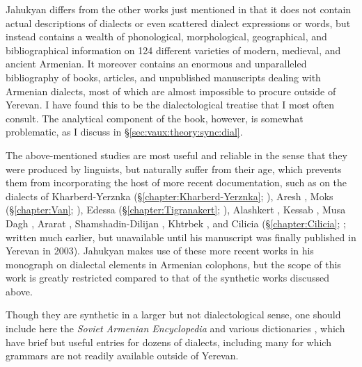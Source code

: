 \documentclass[output=paper]{langscibook}
\begin{document}
Jahukyan \citep{Jahukyan-1972-ArmenianDiaolectology} differs from the other works just mentioned in that it does not contain actual descriptions of dialects or even scattered dialect expressions or words, but instead contains a wealth of phonological, morphological, geographical, and bibliographical information on 124 different varieties of modern, medieval, and ancient Armenian. It moreover contains an enormous and unparalleled bibliography of books, articles, and unpublished manuscripts dealing with Armenian dialects, most of which are almost impossible to procure outside of Yerevan.  I have found this to be the dialectological treatise that I most often consult. The analytical component of the book, however, is somewhat problematic, as I discuss in \S\ref{sec:vaux:theory:sync:dial}.


The above-mentioned studies are most useful and reliable in the sense that they were produced by linguists, but naturally suffer from their age, which prevents them from incorporating the host of more recent documentation, such as on the dialects of Kharberd-Yerznka  (\S\ref{chapter:Kharberd-Yerznka}; \citealt{Kostandyan-1979-YerznkaDialect}),
Aresh \citep{Lusents-1982-AreshDialect},
Moks (\S\ref{chapter:Van}; \citealt{Muradyan-1982-MoksDialect}),
Edessa (\S\ref{chapter:Tigranakert}; \citealt{Haneyan-1982-EdessaDialect}),
Alashkert \citep{Madatyan-1985-Alashkertspeech},
Kessab \citep{Cholakian-2009-KesabDialect},
Musa Dagh  \citep{Habeshian-1986-MusaDagh},
Ararat \citep{Markosyan-1989-AraratDialect},
Shamshadin-Dilijan    \citep{Mejunts-1989-ShamshadinDilijan},
Khtrbek \citep{Hanayan-1995-SvediaDialectKhtrbek}, and  Cilicia (\S\ref{chapter:Cilicia}; \citealt{Adjarian-2003-CiliciaDialect};   written much earlier, but unavailable until his manuscript was finally published in Yerevan in 2003).
Jahukyan makes use of these more recent works in his \citeyear{Jahukyan-1972-ArmenianDiaolectology} monograph on dialectal elements in Armenian colophons, but the scope of this work is greatly restricted compared to that of the synthetic works discussed above.

Though they are synthetic in a larger but not dialectological sense, one should include here the  \textit{Soviet Armenian Encyclopedia} \citep{ArmenianSovietEncyclopedia} and various dictionaries \citep{Petrosyan-1975-LinguisticDictionary,Petrosyan-1987-armenologicalDictionary}, which have brief but useful entries for dozens of dialects, including many for which grammars are not readily available outside of Yerevan.
\end{document}
